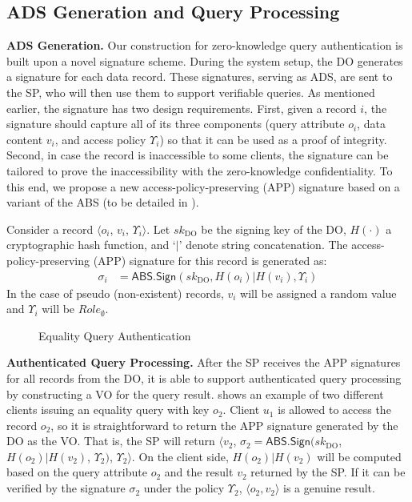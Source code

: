 \subsection{ADS Generation and Query Processing}

\textbf{ADS Generation.} Our construction for zero-knowledge query authentication is built upon a novel signature scheme. During the system setup, the DO generates a signature for each data record. These signatures, serving as ADS, are sent to the SP, who will then use them to support verifiable queries. As mentioned earlier, the signature has two design requirements. First, given a record $i$, the signature should capture all of its three components (query attribute $o_i$, data content $v_i$, and access policy $\Upsilon_i$) so that it can be used as a proof of integrity. Second, in case the record is inaccessible to some clients, the signature can be tailored to prove the inaccessibility with the zero-knowledge confidentiality. To this end, we propose a new access-policy-preserving (APP) signature based on a variant of the ABS (to be detailed in ).

\begin{definition} Consider a record $\langle o_i$, $v_i$, $\Upsilon_i\rangle$. Let ${sk}_{\textrm{DO}}$ be the signing key of the DO, $H(\cdot)$ a cryptographic hash function, and `$|$' denote string concatenation. The access-policy-preserving (APP) signature for this record is generated as:
  \begin{align*}
    \sigma_i & = \textsf{ABS.Sign}({sk}_{\textrm{DO}}, H(o_i) | H(v_i) , \Upsilon_i)
  \end{align*}
  In the case of pseudo (non-existent) records, $v_i$ will be assigned a random value and $\Upsilon_i$ will be ${Role}_{\emptyset}$.
\end{definition}

\begin{figure}[t]
  \centering
  \resizebox{\linewidth}{!}{}
  \caption{Equality Query Authentication}\label{fig:access-control:equality-query}
\end{figure}

\textbf{Authenticated Query Processing.}
After the SP receives the APP signatures for all records from the DO, it is able to support authenticated query processing by constructing a VO for the query result.
 shows an example of two different clients issuing an equality query with key $o_2$.
Client $u_1$ is allowed to access the record $o_2$, so it is straightforward to return the APP signature generated by the DO as the VO\@. That is, the SP will return $\langle v_2$, $\sigma_2 = \textsf{ABS.Sign}({sk}_\text{DO}$, $H(o_2) | H(v_2)$, $\Upsilon_2)$, $\Upsilon_2\rangle$. On the client side, $H(o_2) | H(v_2)$ will be computed based on the query attribute $o_2$ and the result $v_2$ returned by the SP\@. If it can be verified by the signature $\sigma_2$ under the policy $\Upsilon_2$, $\langle o_2, v_2\rangle$ is a genuine result. %

